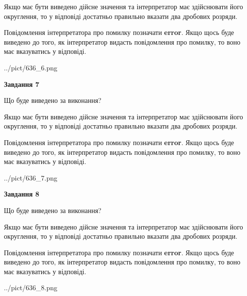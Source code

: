 \documentclass[12pt, ukrainian]{article}
\begin{document}
{\begin {Large}
Якщо має бути виведено дійсне значення та інтерпретатор має здійснювати його округлення, 
то у відповіді достатньо правильно вказати два дробових розряди.

Повідомлення інтерпретатора про помилку позначати \textbf{error}.
Якщо щось буде виведено до того, як інтерпретатор видасть повідомлення про помилку, 
то воно має вказуватись у відповіді. \par

\begin{center}
	{../pict/636_6.png}
\end{center}
\newpage

{\begin {center}\textbf{Завдання 7}\end {center}}\par
Що буде виведено за виконання? \par

Якщо має бути виведено дійсне значення та інтерпретатор має здійснювати його округлення, 
то у відповіді достатньо правильно вказати два дробових розряди.

Повідомлення інтерпретатора про помилку позначати \textbf{error}.
Якщо щось буде виведено до того, як інтерпретатор видасть повідомлення про помилку, 
то воно має вказуватись у відповіді. \par

\begin{center}
	{../pict/636_7.png}
\end{center}
\newpage

{\begin {center}\textbf{Завдання 8}\end {center}}\par
Що буде виведено за виконання? \par

Якщо має бути виведено дійсне значення та інтерпретатор має здійснювати його округлення, 
то у відповіді достатньо правильно вказати два дробових розряди.

Повідомлення інтерпретатора про помилку позначати \textbf{error}.
Якщо щось буде виведено до того, як інтерпретатор видасть повідомлення про помилку, 
то воно має вказуватись у відповіді. \par

\begin{center}
	{../pict/636_8.png}
\end{center}
\newpage


\end{Large}}
\end{document}
